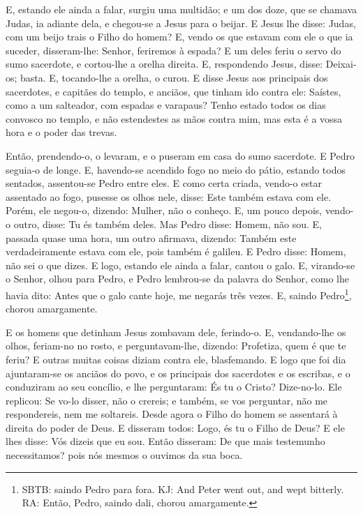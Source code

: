 E, estando ele ainda a falar, surgiu uma multidão; e um dos doze,
que se chamava Judas, ia adiante dela, e chegou-se a Jesus para o
beijar. E Jesus lhe disse: Judas, com um beijo trais o Filho
do homem? E, vendo os que estavam com ele o que ia suceder,
disseram-lhe: Senhor, feriremos à espada? E um deles feriu o
servo do sumo sacerdote, e cortou-lhe a orelha direita. E,
respondendo Jesus, disse: Deixai-os; basta. E, tocando-lhe a orelha,
o curou. E disse Jesus aos principais dos sacerdotes, e
capitães do templo, e anciãos, que tinham ido contra ele: Saístes,
como a um salteador, com espadas e varapaus? Tenho estado
todos os dias convosco no templo, e não estendestes as mãos contra
mim, mas esta é a vossa hora e o poder das trevas.

Então, prendendo-o, o levaram, e o puseram em casa do sumo
sacerdote. E Pedro seguia-o de longe. E, havendo-se acendido
fogo no meio do pátio, estando todos sentados, assentou-se Pedro
entre eles. E como certa criada, vendo-o estar assentado ao
fogo, pusesse os olhos nele, disse: Este também estava com ele.
Porém, ele negou-o, dizendo: Mulher, não o conheço. E,
um pouco depois, vendo-o outro, disse: Tu és também deles. Mas Pedro
disse: Homem, não sou. E, passada quase uma hora, um outro
afirmava, dizendo: Também este verdadeiramente estava com ele, pois
também é galileu. E Pedro disse: Homem, não sei o que dizes.
E logo, estando ele ainda a falar, cantou o galo. E,
virando-se o Senhor, olhou para Pedro, e Pedro lembrou-se da palavra
do Senhor, como lhe havia dito: Antes que o galo cante hoje, me
negarás três vezes. E, saindo Pedro\footnote{SBTB: saindo
Pedro para fora. KJ: And Peter went out, and wept bitterly. RA:
Então, Pedro, saindo dali, chorou amargamente.}, chorou amargamente.

E os homens que detinham Jesus zombavam dele, ferindo-o.
E, vendando-lhe os olhos, feriam-no no rosto, e
perguntavam-lhe, dizendo: Profetiza, quem é que te feriu? E
outras muitas coisas diziam contra ele, blasfemando. E logo
que foi dia ajuntaram-se os anciãos do povo, e os principais dos
sacerdotes e os escribas, e o conduziram ao seu concílio, e lhe
perguntaram: És tu o Cristo? Dize-no-lo. Ele replicou: Se
vo-lo disser, não o crereis; e também, se vos perguntar, não
me respondereis, nem me soltareis. Desde agora o Filho do
homem se assentará à direita do poder de Deus. E disseram
todos: Logo, és tu o Filho de Deus? E ele lhes disse: Vós dizeis que
eu sou. Então disseram: De que mais testemunho necessitamos?
pois nós mesmos o ouvimos da sua boca.

